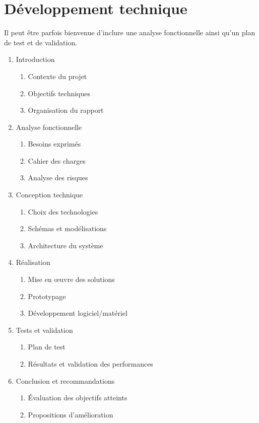 \newpage

\section{Développement technique}

Il peut être parfois bienvenue d'inclure une analyse fonctionnelle ainsi qu'un plan de test et de validation.

\begin{enumerate}[label=\arabic*.]
    \item Introduction
          \begin{enumerate}[label=\arabic{enumi}.\arabic*]
              \item Contexte du projet
              \item Objectifs techniques
              \item Organisation du rapport
          \end{enumerate}
    \item Analyse fonctionnelle
          \begin{enumerate}[label=\arabic{enumi}.\arabic*]
              \item Besoins exprimés
              \item Cahier des charges
              \item Analyse des risques
          \end{enumerate}
    \item Conception technique
          \begin{enumerate}[label=\arabic{enumi}.\arabic*]
              \item Choix des technologies
              \item Schémas et modélisations
              \item Architecture du système
          \end{enumerate}
    \item Réalisation
          \begin{enumerate}[label=\arabic{enumi}.\arabic*]
              \item Mise en œuvre des solutions
              \item Prototypage
              \item Développement logiciel/matériel
          \end{enumerate}
    \item Tests et validation
          \begin{enumerate}[label=\arabic{enumi}.\arabic*]
              \item Plan de test
              \item Résultats et validation des performances
          \end{enumerate}
    \item Conclusion et recommandations
          \begin{enumerate}[label=\arabic{enumi}.\arabic*]
              \item Évaluation des objectifs atteints
              \item Propositions d'amélioration
          \end{enumerate}

\end{enumerate}


